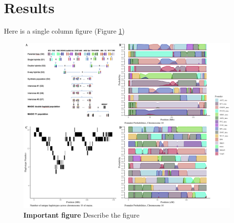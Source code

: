 \documentclass[article,9pt,twocolumn,twoside]{rilabRxiv}
\begin{document}




\section{Results}

Here is a single column figure (Figure \ref{fig:figure1})

\begin{figure}[ht]
\includegraphics[width=0.6\linewidth]{figures/Methods_Fig1.png}
\caption{\textbf{Important figure} Describe the figure }
\label{fig:figure1}
\end{figure}
\end{document}
